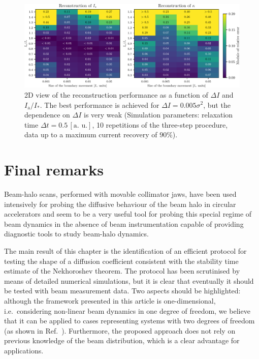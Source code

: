 \begin{figure}[htp]
    \centering
    \includegraphics[width=\textwidth]{4_probing_the_diffusive_behavior/figs/final/MULTI_different_step_size.pdf}
    \caption{2D view of the reconstruction performance as a function of $\Delta I$ and $I_\mathrm{a}/I_\ast$. The  best performance is achieved for $\Delta I = 0.005 \sigma^2$, but the dependence on $\Delta I$ is very weak (Simulation parameters: relaxation time $\Delta t=0.5 \, [\text{a. u.}]$, 10 repetitions of the three-step procedure, data up to a maximum current recovery of $90\%$).}
    \label{fig:different_movement_module}
\end{figure}


\section{Final remarks}
\label{sec:conclusions}


Beam-halo scans, performed with movable collimator jaws, have been used intensively for probing the diffusive behaviour of the beam halo in circular accelerators and seem to be a very useful tool for probing this special regime of beam dynamics in the absence of beam instrumentation capable of providing diagnostic tools to study beam-halo dynamics.

{The main result of this chapter} is the identification of an efficient protocol for testing the shape of {a diffusion coefficient consistent with the stability time estimate of the Nekhoroshev theorem}. The protocol has been scrutinised by means of detailed numerical simulations, {but} it is clear that eventually it should be tested with beam measurement data. Two aspects should be highlighted: although the framework presented in this article is one-dimensional, i.e.\ considering non-linear beam dynamics in one degree of freedom, we believe that it can be applied to cases representing systems with two degrees of freedom (as shown in Ref.~\cite{bazzani2020diffusion}). Furthermore, the proposed approach does not rely on previous knowledge of the beam distribution, which is a clear advantage for applications. 
 
